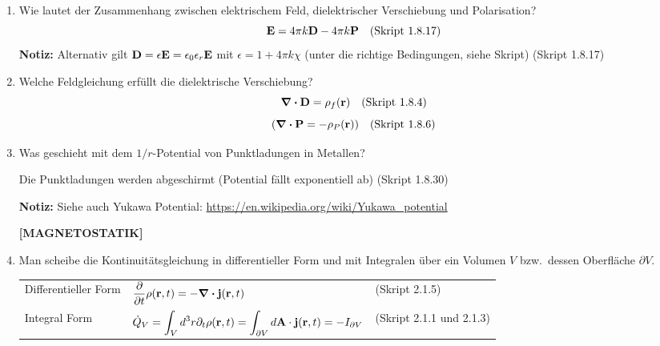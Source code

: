 \documentclass{scrartcl}
\newcommand{\ds}{\displaystyle}
\begin{document}
\begin{enumerate}
\begin{center}
\begin{tabular}{lll}
          \end{tabular}
          \end{center}

    \item Wie lautet der Zusammenhang zwischen elektrischem Feld, 
          dielektrischer Verschiebung und Polarisation?
          $$\vb E= 4\pi k\vb D - 4\pi k\vb P \quad\text{(Skript 1.8.17)}$$
          \textbf{Notiz:} Alternativ gilt $\vb D=\epsilon \vb E
          =\epsilon_0\epsilon_r \vb E$ mit
          $\epsilon=1+4\pi k\chi$ 
          (unter die richtige Bedingungen, siehe Skript) (Skript 1.8.17)\\

    \item Welche Feldgleichung erfüllt die dielektrische Verschiebung?
          $$\div \vb D=\rho_f(\vb r)\quad\text{(Skript 1.8.4)}$$
          $$\qty(\div \vb P=-\rho_P(\vb r))\quad\text{(Skript 1.8.6)}$$

    \item Was geschieht mit dem $1/r$-Potential von Punktladungen in
          Metallen?
          \begin{center}
            Die Punktladungen werden abgeschirmt (Potential fällt 
            exponentiell ab)
            (Skript 1.8.30)
          \end{center}
          \textbf{Notiz:} Siehe auch Yukawa Potential: 
          \url{https://en.wikipedia.org/wiki/Yukawa_potential} 

    \textbf{[MAGNETOSTATIK]}
    \item Man scheibe die Kontinuitätsgleichung in differentieller Form
          und mit Integralen über ein Volumen $V$ bzw.\ dessen Oberfläche 
          $\partial V$.
          \begin{center}
          \begin{tabular}{lll}
            Differentieller Form 
                              & $\ds\pdv{t}\rho(\vb r, t)=
                                 -\div\vb j(\vb r, t)$
                                & (Skript 2.1.5)\\
            Integral Form     & $\ds\dot Q_V
                                =\int_V d^3r\partial_t\rho(\vb r,t)=
                                \int_{\partial V}d\vb A\cdot
                                \vb j(\vb r, t)=-I_{\partial V}$
                                & (Skript 2.1.1 und 2.1.3)\\
          \end{tabular}
          \end{center}


\end{enumerate}
\end{document}

